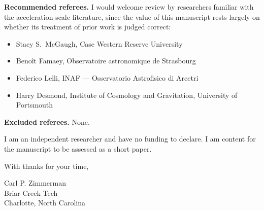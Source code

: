 \documentclass[11pt]{article}
\begin{document}
\vspace{0.6em}
\noindent\textbf{Recommended referees.}
I would welcome review by researchers familiar with the acceleration-scale literature, since the value of
this manuscript rests largely on whether its treatment of prior work is judged correct:
\begin{itemize}
\item Stacy S.\ McGaugh, Case Western Reserve University
\item Beno\^it Famaey, Observatoire astronomique de Strasbourg
\item Federico Lelli, INAF --- Osservatorio Astrofisico di Arcetri
\item Harry Desmond, Institute of Cosmology and Gravitation, University of Portsmouth
\end{itemize}

\vspace{0.4em}
\noindent\textbf{Excluded referees.} None.

\vspace{0.6em}
\noindent
I am an independent researcher and have no funding to declare. I am content for the manuscript to be
assessed as a short paper.

\vspace{1.2em}
\noindent With thanks for your time,

\vspace{1.4em}
\noindent Carl P. Zimmerman\\
Briar Creek Tech\\
Charlotte, North Carolina
\end{document}

